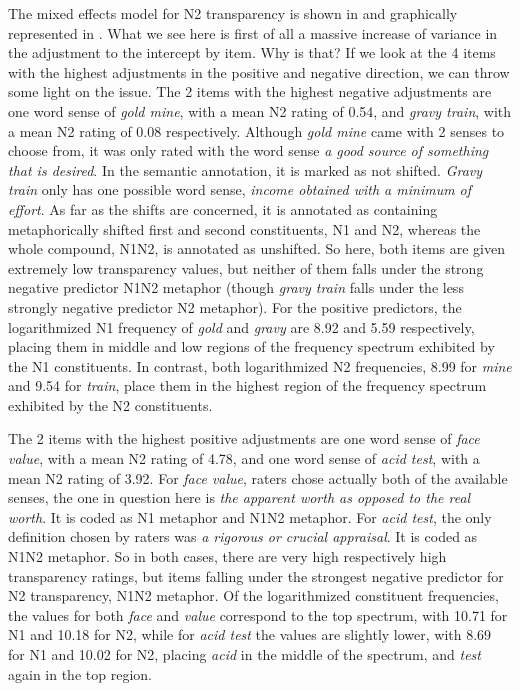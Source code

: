 
The mixed effects model for N2 transparency is shown in 
and graphically represented in
. What we see here is
first of all a massive increase of variance in the adjustment to the
intercept by item. Why is that? If we look at the 4 items with the
highest adjustments in the positive and negative direction, we can
throw some light on the issue.
The 2 items with the highest negative adjustments are one word sense
of \emph{gold
  mine}, with a mean N2 rating of 0.54, and \emph{gravy train}, with a
mean N2 rating of 0.08 respectively. Although \emph{gold
  mine} came with 2 senses to choose from, it was
only rated with the word sense \emph{a good source of something that
  is desired}. In the semantic annotation, it is marked as
not shifted. 
\emph{Gravy train} only has one possible word sense, \emph{income
  obtained with a minimum of effort}.
As far as the shifts are concerned, it is annotated as containing
metaphorically shifted first and second constituents, N1 and N2, whereas
the whole compound, N1N2, is annotated as unshifted. So here,
both items are given extremely low transparency values, but neither of
them falls under the strong negative predictor N1N2 metaphor
(though \emph{gravy train} falls under the less strongly negative
predictor N2 metaphor). For the positive predictors, the
logarithmized N1 frequency
of \emph{gold} and \emph{gravy} are 8.92 and 5.59 respectively,
placing them in middle and low regions of the frequency spectrum
exhibited by the N1 constituents. In contrast, both logarithmized N2
frequencies, 8.99 for \emph{mine} and 9.54 for \emph{train}, place
them in the highest region of the frequency spectrum
exhibited by the N2 constituents.

The 2 items with the highest positive adjustments are one word sense
of \emph{face
  value}, with a mean N2 rating of 4.78, and one word sense of
\emph{acid test}, with a mean N2 rating of 3.92.  For \emph{face
  value}, raters chose actually both of the available senses, the
one in question here is \emph{the apparent worth as opposed to the
  real worth}. It is coded as N1 metaphor and N1N2 metaphor. For \emph{acid test}, the only
definition chosen by raters was \emph{a rigorous or crucial
  appraisal}. It is coded as N1N2 metaphor. So in both cases, there are
 very high respectively high transparency ratings, but items
falling under the strongest negative predictor for N2 transparency,
N1N2 metaphor. Of the logarithmized constituent frequencies, the
values for both \emph{face} and \emph{value} correspond to the top
spectrum, with 10.71 for N1 and 10.18 for N2, while for \emph{acid
  test} the values are slightly lower, with  8.69 for N1 and 10.02 for
N2, placing \emph{acid} in the middle of the spectrum, and \emph{test}
again in the top region.


